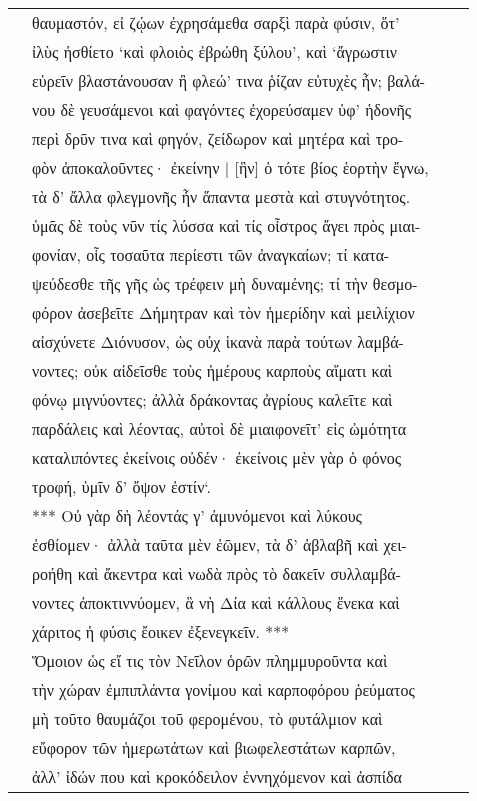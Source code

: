 \documentclass[a4paper,12pt]{article}
\begin{document}
\begin{center}
\begin{xtabular}{p{1cm}p{10.5454545454545cm}p{0.8cm}p{0cm}}
&θαυμαστόν, εἰ ζῴων ἐχρησάμεθα σαρξὶ παρὰ φύσιν, ὅτ’ &&\\
&ἰλὺς ἠσθίετο ‘καὶ φλοιὸς ἐβρώθη ξύλου’, καὶ ‘ἄγρωστιν &&\\
&εὑρεῖν βλαστάνουσαν ἢ φλεώ’ τινα ῥίζαν εὐτυχὲς ἦν; βαλά-&&\\
&νου δὲ γευσάμενοι καὶ φαγόντες ἐχορεύσαμεν ὑφ’ ἡδονῆς &&\\
&περὶ δρῦν τινα καὶ φηγόν, ζείδωρον καὶ μητέρα καὶ τρο- &&\\
&φὸν ἀποκαλοῦντες· ἐκείνην | [ἣν] ὁ τότε βίος ἑορτὴν ἔγνω, &&\\
&τὰ δ’ ἄλλα φλεγμονῆς ἦν ἅπαντα μεστὰ καὶ στυγνότητος. &&\\
&ὑμᾶς δὲ τοὺς νῦν τίς λύσσα καὶ τίς οἶστρος ἄγει πρὸς μιαι-&&\\
&φονίαν, οἷς τοσαῦτα περίεστι τῶν ἀναγκαίων; τί κατα-&&\\
&ψεύδεσθε τῆς γῆς ὡς τρέφειν μὴ δυναμένης; τί τὴν θεσμο-&&\\
&φόρον ἀσεβεῖτε Δήμητραν καὶ τὸν ἡμερίδην καὶ μειλίχιον &&\\
&αἰσχύνετε Διόνυσον, ὡς οὐχ ἱκανὰ παρὰ τούτων λαμβά-&&\\
&νοντες; οὐκ αἰδεῖσθε τοὺς ἡμέρους καρποὺς αἵματι καὶ &&\\
&φόνῳ μιγνύοντες; ἀλλὰ δράκοντας ἀγρίους καλεῖτε καὶ &&\\
&παρδάλεις καὶ λέοντας, αὐτοὶ δὲ μιαιφονεῖτ’ εἰς ὠμότητα &&\\
&καταλιπόντες ἐκείνοις οὐδέν· ἐκείνοις μὲν γὰρ ὁ φόνος &&\\
&τροφή, ὑμῖν δ’ ὄψον ἐστίν‘. &&\\
&*** Οὐ γὰρ δὴ λέοντάς γ’ ἀμυνόμενοι καὶ λύκους &&\\
&ἐσθίομεν· ἀλλὰ ταῦτα μὲν ἐῶμεν, τὰ δ’ ἀβλαβῆ καὶ χει-&&\\
&ροήθη καὶ ἄκεντρα καὶ νωδὰ πρὸς τὸ δακεῖν συλλαμβά-&&\\
&νοντες ἀποκτιννύομεν, ἃ νὴ Δία καὶ κάλλους ἕνεκα καὶ &&\\
&χάριτος ἡ φύσις ἔοικεν ἐξενεγκεῖν. *** &&\\
&Ὅμοιον ὡς εἴ τις τὸν Νεῖλον ὁρῶν πλημμυροῦντα καὶ &&\\
&τὴν χώραν ἐμπιπλάντα γονίμου καὶ καρποφόρου ῥεύματος &&\\
&μὴ τοῦτο θαυμάζοι τοῦ φερομένου, τὸ φυτάλμιον καὶ &&\\
&εὔφορον τῶν ἡμερωτάτων καὶ βιωφελεστάτων καρπῶν,  &&\\
&ἀλλ’ ἰδών που καὶ κροκόδειλον ἐννηχόμενον καὶ ἀσπίδα &&\\

\end{xtabular}
\end{center}
\end{document}
